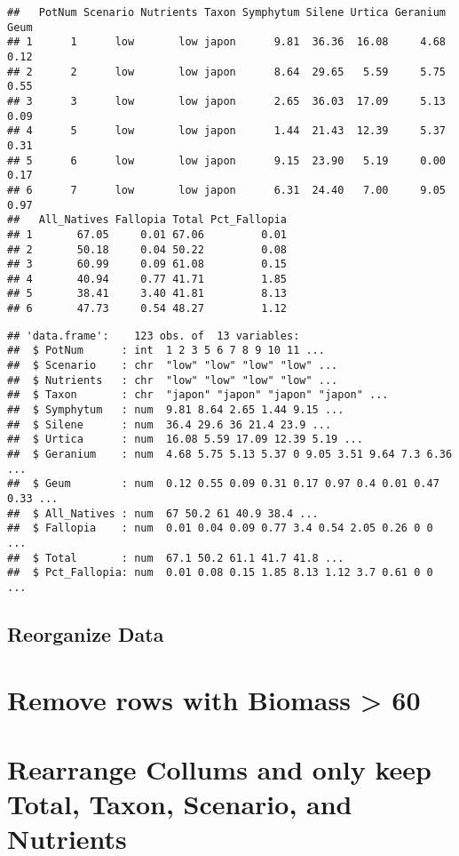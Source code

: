 \documentclass[
]{article}
\begin{document}
\begin{verbatim}
##   PotNum Scenario Nutrients Taxon Symphytum Silene Urtica Geranium Geum
## 1      1      low       low japon      9.81  36.36  16.08     4.68 0.12
## 2      2      low       low japon      8.64  29.65   5.59     5.75 0.55
## 3      3      low       low japon      2.65  36.03  17.09     5.13 0.09
## 4      5      low       low japon      1.44  21.43  12.39     5.37 0.31
## 5      6      low       low japon      9.15  23.90   5.19     0.00 0.17
## 6      7      low       low japon      6.31  24.40   7.00     9.05 0.97
##   All_Natives Fallopia Total Pct_Fallopia
## 1       67.05     0.01 67.06         0.01
## 2       50.18     0.04 50.22         0.08
## 3       60.99     0.09 61.08         0.15
## 4       40.94     0.77 41.71         1.85
## 5       38.41     3.40 41.81         8.13
## 6       47.73     0.54 48.27         1.12
\end{verbatim}

\begin{verbatim}
## 'data.frame':    123 obs. of  13 variables:
##  $ PotNum      : int  1 2 3 5 6 7 8 9 10 11 ...
##  $ Scenario    : chr  "low" "low" "low" "low" ...
##  $ Nutrients   : chr  "low" "low" "low" "low" ...
##  $ Taxon       : chr  "japon" "japon" "japon" "japon" ...
##  $ Symphytum   : num  9.81 8.64 2.65 1.44 9.15 ...
##  $ Silene      : num  36.4 29.6 36 21.4 23.9 ...
##  $ Urtica      : num  16.08 5.59 17.09 12.39 5.19 ...
##  $ Geranium    : num  4.68 5.75 5.13 5.37 0 9.05 3.51 9.64 7.3 6.36 ...
##  $ Geum        : num  0.12 0.55 0.09 0.31 0.17 0.97 0.4 0.01 0.47 0.33 ...
##  $ All_Natives : num  67 50.2 61 40.9 38.4 ...
##  $ Fallopia    : num  0.01 0.04 0.09 0.77 3.4 0.54 2.05 0.26 0 0 ...
##  $ Total       : num  67.1 50.2 61.1 41.7 41.8 ...
##  $ Pct_Fallopia: num  0.01 0.08 0.15 1.85 8.13 1.12 3.7 0.61 0 0 ...
\end{verbatim}

\hypertarget{reorganize-data}{%
\subsection{Reorganize Data}\label{reorganize-data}}

\hypertarget{remove-rows-with-biomass-60}{%
\section{Remove rows with Biomass \textgreater{}
60}\label{remove-rows-with-biomass-60}}

\hypertarget{rearrange-collums-and-only-keep-total-taxon-scenario-and-nutrients}{%
\section{Rearrange Collums and only keep Total, Taxon, Scenario, and
Nutrients}\label{rearrange-collums-and-only-keep-total-taxon-scenario-and-nutrients}}
\end{document}
